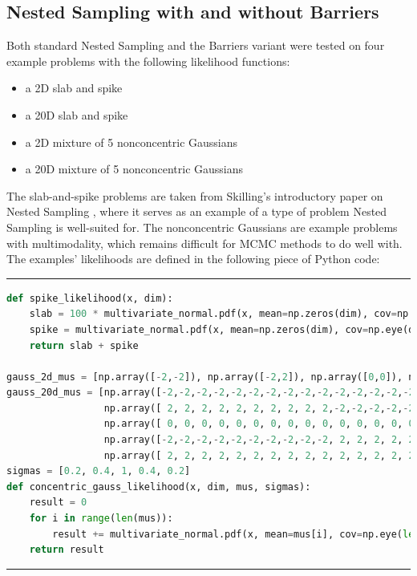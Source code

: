 \documentclass[12pt, a4paper]{report}
\begin{document}
\subsection{Nested Sampling with and without Barriers}
Both standard Nested Sampling and the Barriers variant were tested on four example problems with the following likelihood functions:
\begin{itemize}
    \item a 2D slab and spike
    \item a 20D slab and spike
    \item a 2D mixture of 5 nonconcentric Gaussians
    \item a 20D mixture of 5 nonconcentric Gaussians 
\end{itemize}
The slab-and-spike problems are taken from Skilling's introductory paper on Nested Sampling \cite{skilling}, where it serves as an example of a type of problem Nested Sampling is well-suited for.
The nonconcentric Gaussians are example problems with multimodality, which remains difficult for MCMC methods to do well with.
The examples' likelihoods are defined in the following piece of Python code:
\vspace{0.4cm}

\hrule
\begin{lstlisting}[language=Python]
def spike_likelihood(x, dim):
    slab = 100 * multivariate_normal.pdf(x, mean=np.zeros(dim), cov=np.eye(dim)*0.01)
    spike = multivariate_normal.pdf(x, mean=np.zeros(dim), cov=np.eye(dim)*0.1)
    return slab + spike

gauss_2d_mus = [np.array([-2,-2]), np.array([-2,2]), np.array([0,0]), np.array([2,-2]), np.array([2, 2])]
gauss_20d_mus = [np.array([-2,-2,-2,-2,-2,-2,-2,-2,-2,-2,-2,-2,-2,-2,-2,-2,-2,-2,-2,-2]),
                 np.array([ 2, 2, 2, 2, 2, 2, 2, 2, 2, 2,-2,-2,-2,-2,-2,-2,-2,-2,-2,-2]),
                 np.array([ 0, 0, 0, 0, 0, 0, 0, 0, 0, 0, 0, 0, 0, 0, 0, 0, 0, 0, 0, 0]),
                 np.array([-2,-2,-2,-2,-2,-2,-2,-2,-2,-2, 2, 2, 2, 2, 2, 2, 2, 2, 2, 2]),
                 np.array([ 2, 2, 2, 2, 2, 2, 2, 2, 2, 2, 2, 2, 2, 2, 2, 2, 2, 2, 2, 2])]
sigmas = [0.2, 0.4, 1, 0.4, 0.2]
def concentric_gauss_likelihood(x, dim, mus, sigmas):
    result = 0
    for i in range(len(mus)):
        result += multivariate_normal.pdf(x, mean=mus[i], cov=np.eye(len(mus[i]))*sigmas[i])
    return result
\end{lstlisting}
\hrule
\end{document}
